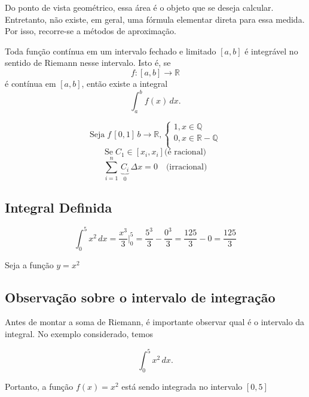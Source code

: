 Do ponto de vista geométrico, essa área é o objeto que se deseja calcular. Entretanto, não existe, em geral, uma fórmula elementar direta para essa medida. Por isso, recorre-se a métodos de aproximação.

\begin{theorem}
Toda função contínua em um intervalo fechado e limitado \([a,b]\) é integrável
no sentido de Riemann nesse intervalo. Isto é, se
\[
f:[a,b]\to\mathbb{R}
\]
é contínua em \([a,b]\), então existe a integral
\[
\int_a^b f(x)\,dx.
\]
\end{theorem}

\begin{example}[]
  \[
  \text{Seja}\;f\,[0,1]\,b\to \mathbb{R}, \begin{cases}
    1, x \in \mathbb{Q}\\
    0, x \in \mathbb{R}-\mathbb{Q}\\
  \end{cases}
  \]
  \[
  \text{Se} \;C_1 \in [x_i, x_i] \text{(é racional)}
  \]
  \[
  \sum_{i=1}^n\,{\underbrace{C_i}_0} \,\Delta x=0 \quad\text{(irracional)}
  \]
\end{example}

\subsection{Integral Definida}

\begin{example}
  \[
    \int_0^5 x^2\,dx 
    = \frac{x^3}{3}\bigg|_0^5 
    = \frac{5^3}{3} - \frac{0^3}{3}
    = \frac{125}{3} - 0 
    = \frac{125}{3}
  \]
\end{example}

\begin{example}
  Seja a função $y=x^2$

\end{example}

\subsection*{Observação sobre o intervalo de integração}

Antes de montar a soma de Riemann, é importante observar qual é o
intervalo da integral. No exemplo considerado, temos

\[
\int_0^5 x^2\,dx.
\]

Portanto, a função \(f(x)=x^2\) está sendo integrada no intervalo $[0, 5]$

